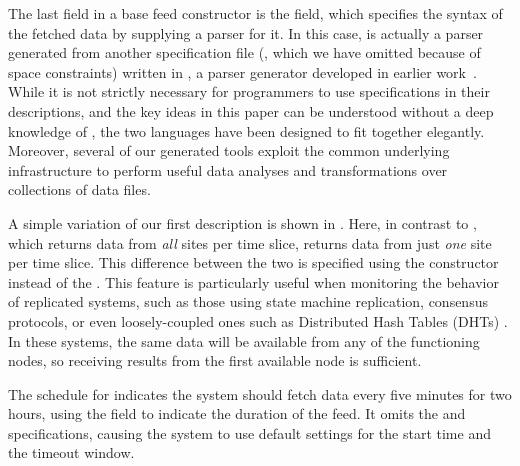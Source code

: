 The last field in a base feed constructor is the  field,
which specifies the syntax of the fetched
data by supplying a parser for it.  In this case,  is 
actually a parser generated from another specification file 
(, which we have omitted because of space
constraints) written
in \padsml{}, a parser generator developed in earlier 
work~\cite{mandelbaum+:pads-ml}.  While it is not strictly necessary for
\padsd{} programmers to use \padsml{} specifications in their descriptions,
and the key ideas in this paper can be understood without a deep knowledge
of \padsml{}, the two languages have been designed to fit together elegantly.
Moreover, several of our generated tools exploit the common underlying 
infrastructure to perform useful data analyses and transformations over
collections of data files.  


A simple variation of our first description is shown in .
Here, in contrast to , which returns data from
{\em all} sites per time slice,  returns data from just 
{\em one} site per time slice.  This difference between the two is
specified using the  constructor instead of the .
%
%
This feature is particularly useful when monitoring the
behavior of replicated systems, such as those using
state machine replication, consensus protocols, or even
loosely-coupled ones such as Distributed Hash Tables (DHTs) 
\cite{Balakrishnan+03:dht}.
In these systems, the same data will be available from any
of the functioning nodes, so receiving results from the first
available node is sufficient. 

The schedule for  indicates the system should fetch data
every five minutes for two hours, using the  field to indicate
the duration of the feed.  It omits the  and
 specifications, causing the system to use default
settings for the start time and the timeout window.  



